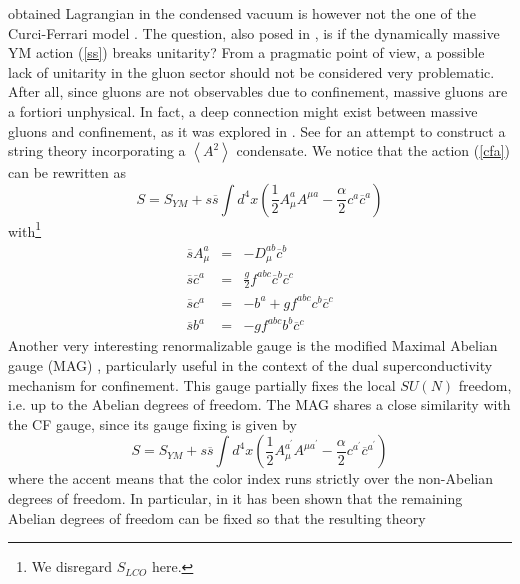 \documentclass[a4paper,12pt]{article}
\begin{document}
obtained Lagrangian in the condensed vacuum is however not the one
of the Curci-Ferrari model \cite {Curci:bt,Curci:1976ar}. The
question, also posed in \cite{v1}, is if the dynamically massive
YM action (\ref{ss}) breaks unitarity? From a pragmatic point of
view, a possible lack of unitarity in the gluon sector should not
be considered very problematic. After all, since gluons are not
observables due to confinement, massive gluons are a fortiori
unphysical. In fact, a deep connection might exist between massive
gluons and confinement, as it was explored in \cite{Kugo:gm}. See
\cite{Kondo:2002xn} for an attempt to construct a string theory
incorporating a $\left\langle A^{2}\right\rangle $ condensate.
\newline
\newline
We notice that the action (\ref{cfa}) can be rewritten as
\begin{equation}
S=S_{YM}+s\overline{s}\int d^{4}x\left( \frac{1}{2}A_{\mu }^{a}A^{\mu a}-%
\frac{\alpha }{2}c^{a}\overline{c}^{a}\right)   \label{cfa2}
\end{equation}
with\footnote{%
We disregard $S_{LCO}$ here.}
\begin{eqnarray}
\overline{s}A_{\mu }^{a} &=&-D_{\mu }^{ab}\overline{c}^{b}  \nonumber \\
\overline{s}\overline{c}^{a} &=&\frac{g}{2}f^{abc}\overline{c}^{b}\overline{c%
}^{c}  \nonumber \\
\overline{s}c^{a} &=&-b^{a}+gf^{abc}c^{b}\overline{c}^{c}  \nonumber \\
\overline{s}b^{a} &=&-gf^{abc}b^{b}\overline{c}^{c}  \label{sbar}
\end{eqnarray}
Another very interesting renormalizable gauge is the modified
Maximal Abelian gauge (MAG) \cite{Kondo:1997pc}, particularly
useful in the context of the dual superconductivity mechanism for
confinement. This gauge partially fixes the local $SU(N)$ freedom,
i.e. up to the Abelian degrees of freedom. The MAG shares a close
similarity with the CF gauge, since its gauge fixing is given by
\begin{equation}
S=S_{YM}+s\overline{s}\int d^{4}x\left( \frac{1}{2}A_{\mu }^{a^{\prime
}}A^{\mu a^{\prime }}-\frac{\alpha }{2}c^{a^{\prime }}\overline{c}%
^{a^{\prime }}\right)   \label{dudal30}
\end{equation}
where the accent means that the color index runs strictly over the
non-Abelian degrees of freedom. In particular, in \cite
{Dudal:2002ye} it has been shown that the remaining Abelian
degrees of freedom can be fixed so that the resulting theory
\end{document}
